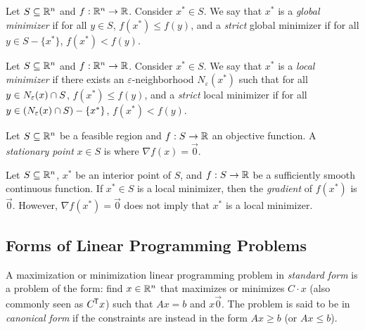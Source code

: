 \begin{defn}
    Let $S \subseteq \mathbb{R}^n$ and $f: \mathbb{R}^n \to \mathbb{R}$. Consider $x^* \in S$. We say that $x^*$ is a \emph{global minimizer} if for all $y \in S$, $f(x^*) \leq f(y)$, and a \emph{strict} global minimizer if for all $y \in S - \{x^*\}$, $f(x^*) < f(y)$.
\end{defn}

\begin{defn}
    Let $S \subseteq \mathbb{R}^n$ and $f: \mathbb{R}^n \to \mathbb{R}$. Consider $x^* \in S$. We say that $x^*$ is a \emph{local minimizer} if there exists an $\varepsilon$-neighborhood $N_{\varepsilon}(x^*)$ such that for all $y \in N_{\varepsilon}(x) \cap S$, $f(x^*) \leq f(y)$, and a \emph{strict} local minimizer if for all $y \in \left(N_{\varepsilon}(x) \cap S\right) - \{x^*\}$, $f(x^*) < f(y)$.
\end{defn}

\begin{defn}
    Let $S \subseteq \mathbb{R}^n$ be a feasible region and $f: S \to \mathbb{R}$ an objective function. A \emph{stationary point} $x \in S$ is where $\nabla f(x) = \vec{0}.$
\end{defn}

\begin{rmk}
    Let $S \subseteq \mathbb{R}^n$, $x^*$ be an interior point of $S$, and $f: S \to \mathbb{R}$ be a sufficiently smooth continuous function. If $x^* \in S$ is a local minimizer, then the \emph{gradient} of $f(x^*)$ is $\vec{0}$. However, $\nabla f(x^*) = \vec{0}$ does not imply that $x^*$ is a local minimizer.
\end{rmk}

\subsection{Forms of Linear Programming Problems}

\begin{defn}
    A maximization or minimization linear programming problem in \emph{standard form} is a problem of the form:
    find $x \in \mathbb{R}^n$ that maximizes or minimizes $C \cdot x$ (also commonly seen as $C^{\mkern-1.5mu\mathsf{T}}x$) such that $Ax = b$ and $x \vec{0}$. The problem is said to be in \emph{canonical form} if the constraints are instead in the form $Ax \geq b$ (or $Ax \leq b$).
\end{defn}

